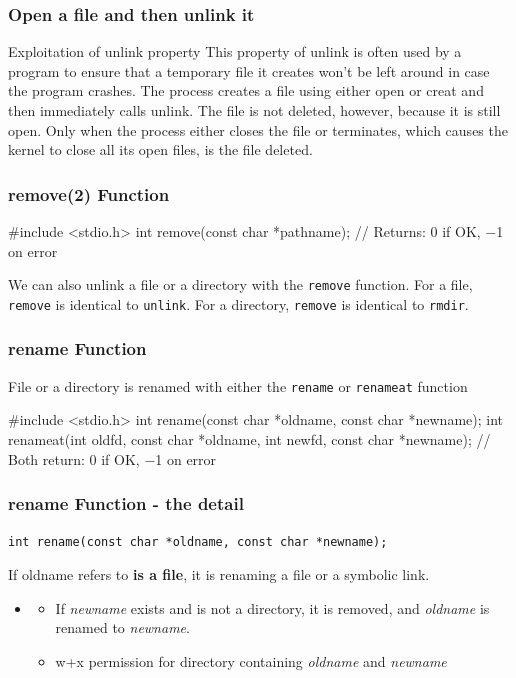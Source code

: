 \documentclass[newPxFont,sthlmFooter,nooffset]{beamer}
\begin{document}
\begin{frame}[t]
  \frametitle{Open a file and then unlink it}
  \begin{block}{Exploitation of unlink property}
  This property of unlink is often used by a program to ensure that a temporary file it creates won’t be left around in case the program crashes. The process creates a file using either open or creat and then immediately calls unlink. The file is not deleted, however, because it is still open. Only when the process either closes the file or terminates, which causes the kernel to close all its open files, is the file deleted.
  \end{block}
\end{frame}



\begin{frame}[containsverbatim,t]
  \frametitle{remove(2) Function}
\begin{codedef}
#include <stdio.h>
int remove(const char *pathname);
// Returns: 0 if OK, −1 on error
\end{codedef}

We can also unlink a file or a directory with the \texttt{remove} function. For a file, \texttt{remove} is identical to \texttt{unlink}. For a directory, \texttt{remove} is identical to \texttt{rmdir}.
\end{frame}

\begin{frame}[containsverbatim,t]
  \frametitle{rename Function}
File or a directory is renamed with either the \texttt{rename} or \texttt{renameat} function

\begin{codedef}
#include <stdio.h>
int rename(const char *oldname, const char *newname);
int renameat(int oldfd, const char *oldname, int newfd, const char *newname);
// Both return: 0 if OK, −1 on error
\end{codedef}

\end{frame}

\begin{frame}[t]
  \frametitle{rename Function - the detail}
\texttt{int rename(const char *oldname, const char *newname);}
\bigskip

If oldname refers to \textbf{is a file}, it is renaming a file or a symbolic link.
{\footnotesize
\begin{itemize}
\item
  \begin{itemize}
  \item If \textit{newname} exists and is not a directory, it is
    removed, and \textit{oldname} is renamed to \textit{newname}.
  \item w+x permission for directory containing \textit{oldname} and \textit{newname}
  \end{itemize}
\end{itemize}
}

\end{frame}
\end{document}
